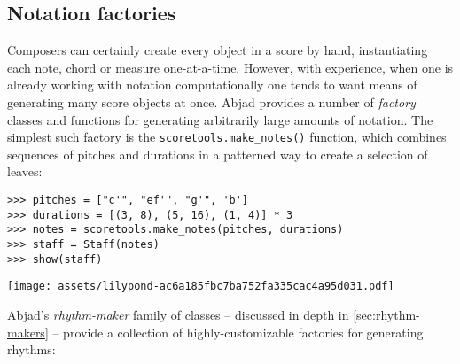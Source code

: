 \subsection{Notation factories}
\label{ssec:notation-factories}

Composers can certainly create every object in a score by hand,
instantiating each note, chord or measure one-at-a-time. However, with
experience, when one is already working with notation computationally one tends
to want means of generating many score objects at once. Abjad provides a number
of \emph{factory} classes and functions for generating arbitrarily large
amounts of notation. The simplest such factory is the
\texttt{scoretools.make\_notes()} function, which combines sequences of pitches
and durations in a patterned way to create a selection of leaves:

\begin{comment}
<abjad>
pitches = ["c'", "ef'", "g'", 'b']
durations = [(3, 8), (5, 16), (1, 4)] * 3
notes = scoretools.make_notes(pitches, durations)
staff = Staff(notes)
show(staff)
</abjad>
\end{comment}

\begin{abjadbookoutput}
\begin{singlespacing}
\vspace{-0.5\baselineskip}
\begin{verbatim}
>>> pitches = ["c'", "ef'", "g'", 'b']
>>> durations = [(3, 8), (5, 16), (1, 4)] * 3
>>> notes = scoretools.make_notes(pitches, durations)
>>> staff = Staff(notes)
>>> show(staff)
\end{verbatim}
\noindent\texttt{[image: assets/lilypond-ac6a185fbc7ba752fa335cac4a95d031.pdf]}
\end{singlespacing}
\end{abjadbookoutput}

\noindent Abjad's \emph{rhythm-maker} family of classes -- discussed in depth
in \autoref{sec:rhythm-makers} -- provide a collection of highly-customizable
factories for generating rhythms:

\begin{comment}
<abjad>
rhythm_maker = rhythmmakertools.TaleaRhythmMaker(
    talea=rhythmmakertools.Talea(
        counts=[1, 2, 3, 4],
        denominator=16,
        ),
    tie_specifier=rhythmmakertools.TieSpecifier(
        tie_across_divisions=True,
        ),
    )
divisions = [(3, 8), (5, 8), (2, 8), (3, 8), (3, 8)]
rhythm = rhythm_maker(divisions)
staff = Staff(rhythm)
show(staff)
</abjad>
\end{comment}

